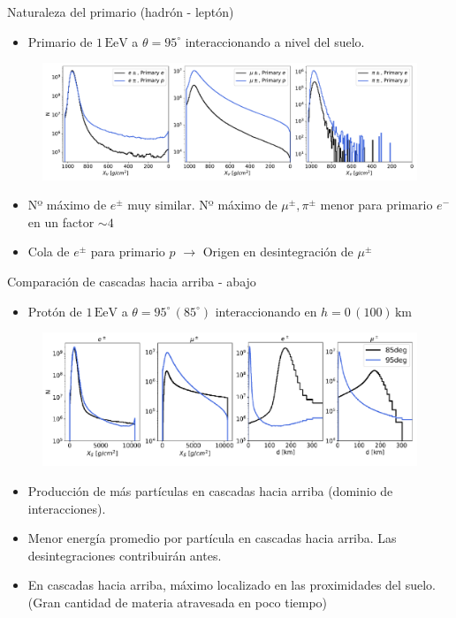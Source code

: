\documentclass{beamer}
\begin{document}
\begin{frame}{Naturaleza del primario (hadrón - leptón)}
	\begin{itemize}
		\item Primario de $1\,\mathrm{EeV}$ a $\theta = 95^\circ$ interaccionando a nivel del suelo.
		\end{itemize}
			\begin{figure}[H]
			\centering
			\includegraphics[width=1.\linewidth]{figures/cascadas/upgoing_pe_1EeV_95deg_0km_v2}
		\end{figure}
	\begin{itemize}
		\item Nº máximo de $e^\pm$ muy similar. Nº máximo de $\mu^\pm,\pi^\pm$ menor para primario $e^-$ en un factor $\sim 4$
		\item Cola de $e^\pm$ para primario $p$ $\rightarrow$ Origen en desintegración de $\mu^\pm$
	\end{itemize}
\end{frame}
\begin{frame}{Comparación de cascadas hacia arriba - abajo}
	\begin{itemize}
		\item Protón de $1\,\mathrm{EeV}$ a $\theta=95^\circ \,(85^\circ)$ interaccionando en $h=0\,(100)\,\mathrm{km}$ 
	\end{itemize}
\begin{figure}[H]
	\centering
	\includegraphics[width=.95\linewidth]{figures/comp_ugdg_slides}
\end{figure}
	\begin{itemize}
		\item Producción de más partículas en cascadas hacia arriba (dominio de interacciones).
		\item Menor energía promedio por partícula en cascadas hacia arriba. Las desintegraciones contribuirán antes.
		\item En cascadas hacia arriba, máximo localizado en las proximidades del suelo. (Gran cantidad de materia atravesada en poco tiempo)
	\end{itemize}
\end{frame}
\end{document}
